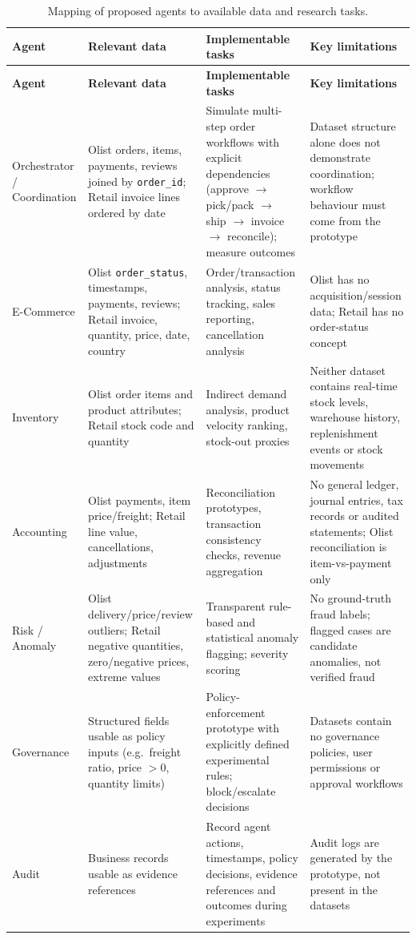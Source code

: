 \documentclass[11pt,a4paper]{article}
\newcommand{\code}[1]{\texttt{#1}}
\begin{document}
\begin{longtable}{L{2.2cm}L{3.6cm}L{4.0cm}L{5.2cm}}
\caption{Mapping of proposed agents to available data and research tasks.}\label{tab:agents}\\
\toprule
\textbf{Agent} & \textbf{Relevant data} & \textbf{Implementable tasks} & \textbf{Key limitations} \\
\midrule
\endfirsthead
\toprule
\textbf{Agent} & \textbf{Relevant data} & \textbf{Implementable tasks} & \textbf{Key limitations} \\
\midrule
\endhead
\footnotesize
Orchestrator / Coordination &
Olist orders, items, payments, reviews joined by \code{order\_id}; Retail invoice lines ordered by date &
Simulate multi-step order workflows with explicit dependencies (approve $\rightarrow$ pick/pack $\rightarrow$ ship $\rightarrow$ invoice $\rightarrow$ reconcile); measure outcomes &
Dataset structure alone does not demonstrate coordination; workflow behaviour must come from the prototype \\
E-Commerce &
Olist \code{order\_status}, timestamps, payments, reviews; Retail invoice, quantity, price, date, country &
Order/transaction analysis, status tracking, sales reporting, cancellation analysis &
Olist has no acquisition/session data; Retail has no order-status concept \\
Inventory &
Olist order items and product attributes; Retail stock code and quantity &
Indirect demand analysis, product velocity ranking, stock-out proxies &
Neither dataset contains real-time stock levels, warehouse history, replenishment events or stock movements \\
Accounting &
Olist payments, item price/freight; Retail line value, cancellations, adjustments &
Reconciliation prototypes, transaction consistency checks, revenue aggregation &
No general ledger, journal entries, tax records or audited statements; Olist reconciliation is item-vs-payment only \\
Risk / Anomaly &
Olist delivery/price/review outliers; Retail negative quantities, zero/negative prices, extreme values &
Transparent rule-based and statistical anomaly flagging; severity scoring &
No ground-truth fraud labels; flagged cases are candidate anomalies, not verified fraud \\
Governance &
Structured fields usable as policy inputs (e.g.\ freight ratio, price $>0$, quantity limits) &
Policy-enforcement prototype with explicitly defined experimental rules; block/escalate decisions &
Datasets contain no governance policies, user permissions or approval workflows \\
Audit &
Business records usable as evidence references &
Record agent actions, timestamps, policy decisions, evidence references and outcomes during experiments &
Audit logs are generated by the prototype, not present in the datasets \\
\bottomrule
\end{longtable}
\end{document}
